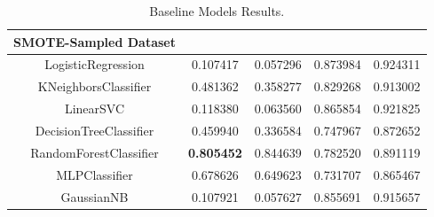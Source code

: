 \documentclass[12pt,a4paper,twoside]{report}
\begin{document}
\begin{table}[!htbp]
\begin{tabular}{ccccc}
    \textbf{SMOTE-Sampled Dataset} \\  \midrule
    
    LogisticRegression & 0.107417 &  0.057296 & 0.873984  & 0.924311 \\
    KNeighborsClassifier &0.481362  & 0.358277 & 0.829268 & 0.913002\\
    LinearSVC  & 0.118380 &  0.063560 & 0.865854  & 0.921825 \\
    DecisionTreeClassifier & 0.459940  & 0.336584 & 0.747967 & 0.872652 \\
    RandomForestClassifier &  \textbf{0.805452}  & 0.844639 & 0.782520 & 0.891119\\
    MLPClassifier & 0.678626 &  0.649623 & 0.731707 & 0.865467 \\
    GaussianNB & 0.107921 &  0.057627 & 0.855691 & 0.915657 \\
    
   \bottomrule
 \end{tabular}
 \caption{Baseline Models Results.}
\label{table:baseline-results}
\end{table}
\end{document}

